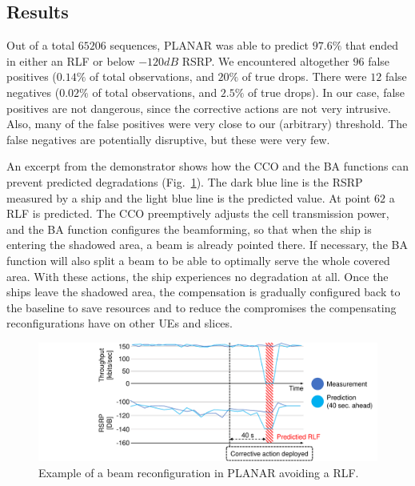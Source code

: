 		\subsection{Results}

			Out of a total $65206$ sequences, \ac{PLANAR} was able to predict $97.6\%$ that ended in either an \ac{RLF} or below $-120dB$ \ac{RSRP}.
			We encountered altogether $96$ false positives ($0.14\%$ of total observations, and $20\%$ of true drops.
			There were $12$ false negatives ($0.02\%$ of total observations, and $2.5\%$ of true drops).
			In our case, false positives are not dangerous, since the corrective actions are not very intrusive. Also, many of the false positives were very close to our (arbitrary) threshold.
			The false negatives are potentially disruptive, but these were very few.

			An excerpt from the demonstrator shows how the \ac{CCO} and the \ac{BA} functions can prevent predicted degradations (Fig.~\ref{fig:pred_control_example}).
			The dark blue line is the \ac{RSRP} measured by a ship and the light blue line is the predicted value.
			At point $62$ a \ac{RLF} is predicted.
			The \ac{CCO} preemptively adjusts the cell transmission power, and the \ac{BA} function configures the beamforming, so that when the ship is entering the shadowed area, a beam is already pointed there.
			If necessary, the \ac{BA} function will also split a beam to be able to optimally serve the whole covered area.
			With these actions, the ship experiences no degradation at all.
			Once the ships leave the shadowed area, the compensation is gradually configured back to the baseline to save resources and to reduce the compromises the compensating reconfigurations have on other \acp{UE} and slices.
			
			\begin{figure}[ht]
				\centering
				\includegraphics[width=\columnwidth]{figures/10_pred_control/pred_control_example/example.pdf}
				\caption[Example of a beam reconfiguration in PLANAR]{Example of a beam reconfiguration in PLANAR avoiding a RLF.}
				\label{fig:pred_control_example}
			\end{figure}
			
